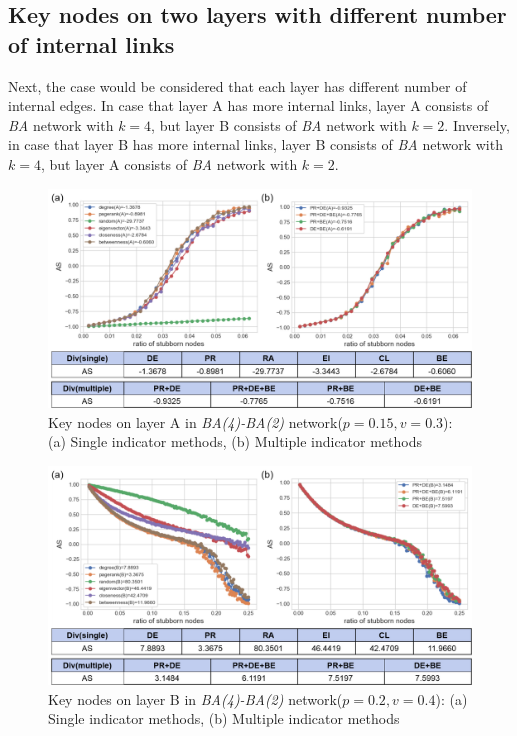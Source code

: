 \subsection{Key nodes on two layers with different number of internal links}
Next, the case would be considered that each layer has different number of internal edges. In case that layer A has more internal links, layer A consists of \textit{BA} network with $k=4$, but layer B consists of \textit{BA} network with $k=2$. Inversely, in case that layer B has more internal links, layer B consists of \textit{BA} network with $k=4$, but layer A consists of \textit{BA} network with $k=2$. 
\begin{figure}[!htb]
	\centering
	\includegraphics[width=\hsize]{figure/chap5_keynode_internal_A.png}
	\caption{Key nodes on layer A in \textit{BA(4)-BA(2)} network($p=0.15, v=0.3$):
		(a) Single indicator methods, (b) Multiple indicator methods}
	\label{chap5_keynode_internal_A}
\end{figure}
\begin{figure}[!htb]
	\centering
	\includegraphics[width=\hsize]{figure/chap5_keynode_internal_B.png}
	\caption{Key nodes on layer B in \textit{BA(4)-BA(2)} network($p=0.2, v=0.4$):
		(a) Single indicator methods, (b) Multiple indicator methods}
	\label{chap5_keynode_internal_B}
\end{figure}
